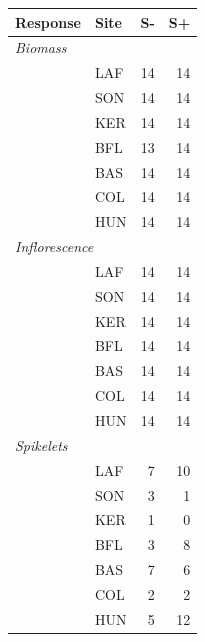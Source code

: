 \begin{tabular}{llrr}
\hline
Response & Site & S- & S+ \\
\hline

\multicolumn{4}{l}{\textit{Biomass}} \\
 & LAF & 14 & 14 \\
 & SON & 14 & 14 \\
 & KER & 14 & 14 \\
 & BFL & 13 & 14 \\
 & BAS & 14 & 14 \\
 & COL & 14 & 14 \\
 & HUN & 14 & 14 \\

\multicolumn{4}{l}{\textit{Inflorescence}} \\
 & LAF & 14 & 14 \\
 & SON & 14 & 14 \\
 & KER & 14 & 14 \\
 & BFL & 14 & 14 \\
 & BAS & 14 & 14 \\
 & COL & 14 & 14 \\
 & HUN & 14 & 14 \\

\multicolumn{4}{l}{\textit{Spikelets}} \\
 & LAF &  7 & 10 \\
 & SON &  3 &  1 \\
 & KER &  1 &  0 \\
 & BFL &  3 &  8 \\
 & BAS &  7 &  6 \\
 & COL &  2 &  2 \\
 & HUN &  5 & 12 \\
\hline
\end{tabular}
